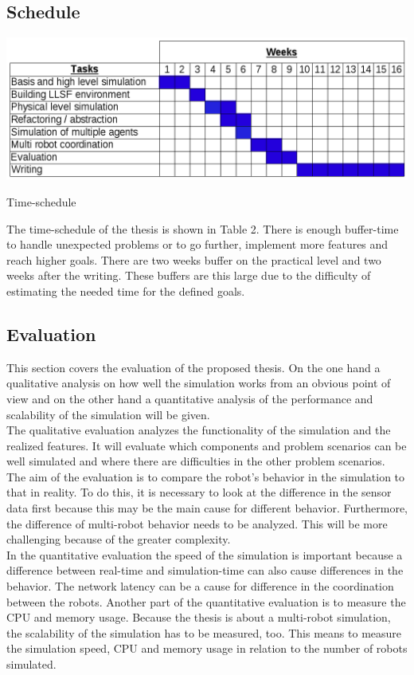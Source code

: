 \documentclass[a4paper,11pt]{article}
\begin{document}
\subsection{Schedule}
\begin{table}
\centering
\includegraphics[scale=0.4]{pics/Schedule.png}
\label{Table 2}
\caption{Time-schedule}
\end{table}

The time-schedule of the thesis is shown in Table 2. There is enough buffer-time to handle unexpected problems or to go further, implement more features and reach higher goals. There are two weeks buffer on the practical level and two weeks after the writing. These buffers are this large due to the difficulty of estimating the needed time for the defined goals.

\subsection{Evaluation}
This section covers the evaluation of the proposed thesis. On the one hand a qualitative analysis on how well the simulation works from an obvious point of view and on the other hand a quantitative analysis of the performance and scalability of the simulation will be given.\\
The qualitative evaluation analyzes the functionality of the simulation and the realized features. It will evaluate which components and problem scenarios can be well simulated and where there are difficulties in the other problem scenarios. The aim of the evaluation is to compare the robot's behavior in the simulation to that in reality. To do this, it is necessary to look at the difference in the sensor data first because this may be the main cause for different behavior. Furthermore, the difference of multi-robot behavior needs to be analyzed. This will be more challenging because of the greater complexity.\\
In the quantitative evaluation the speed of the simulation is important because a difference between real-time and simulation-time can also cause differences in the behavior. The network latency can be a cause for difference in the coordination between the robots. Another part of the quantitative evaluation is to measure the CPU and memory usage. Because the thesis is about a multi-robot simulation, the scalability of the simulation has to be measured, too. This means to measure the simulation speed, CPU and memory usage in relation to the number of robots simulated.
\end{document}
